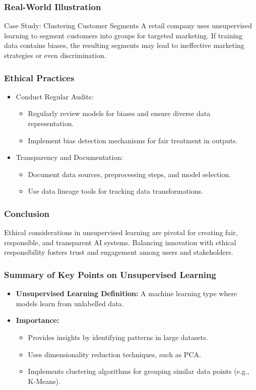 \documentclass[aspectratio=169]{beamer}
\begin{document}
\begin{frame}[fragile]
    \frametitle{Real-World Illustration}
    \begin{block}{Case Study: Clustering Customer Segments}
        A retail company uses unsupervised learning to segment customers into groups for targeted marketing. If training data contains biases, the resulting segments may lead to ineffective marketing strategies or even discrimination.
    \end{block}
\end{frame}

\begin{frame}[fragile]
    \frametitle{Ethical Practices}
    \begin{itemize}
        \item Conduct Regular Audits: 
        \begin{itemize}
            \item Regularly review models for biases and ensure diverse data representation.
            \item Implement bias detection mechanisms for fair treatment in outputs.
        \end{itemize}
        \item Transparency and Documentation:
        \begin{itemize}
            \item Document data sources, preprocessing steps, and model selection.
            \item Use data lineage tools for tracking data transformations.
        \end{itemize}
    \end{itemize}
\end{frame}

\begin{frame}[fragile]
    \frametitle{Conclusion}
    Ethical considerations in unsupervised learning are pivotal for creating fair, responsible, and transparent AI systems. Balancing innovation with ethical responsibility fosters trust and engagement among users and stakeholders.
\end{frame}

\begin{frame}[fragile]
    \frametitle{Summary of Key Points on Unsupervised Learning}
    
    \begin{itemize}
        \item \textbf{Unsupervised Learning Definition:} A machine learning type where models learn from unlabelled data.
        \item \textbf{Importance:}
        \begin{itemize}
            \item Provides insights by identifying patterns in large datasets.
            \item Uses dimensionality reduction techniques, such as PCA.
            \item Implements clustering algorithms for grouping similar data points (e.g., K-Means).
        \end{itemize}
    \end{itemize}
\end{frame}
\end{document}
